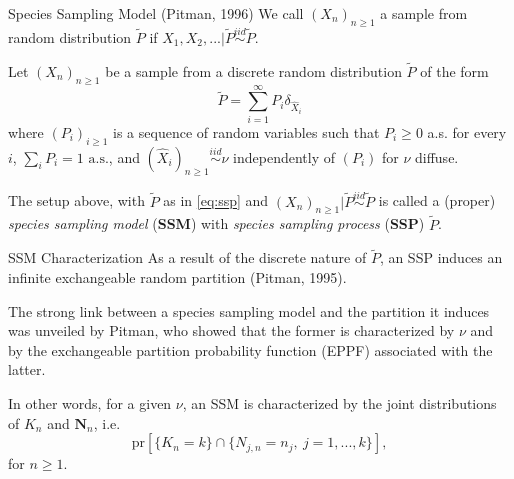 \documentclass[11pt, handout]{beamer}
\begin{document}
\begin{frame}{Species Sampling Model (Pitman, 1996)}
    We call \((X_n)_{n \geq 1}\) a sample from random distribution \(\tilde{P}\) if \(X_1,X_2,... | \tilde{P} \overset{iid}{\sim} \tilde{P}\).
    \begin{definition}
        \label{th:ssm}
        Let \((X_n)_{n \geq 1}\) be a sample from a discrete random distribution \(\tilde{P}\) of the form
        \begin{equation}
            \label{eq:ssp}
            \tilde{P} = \sum_{i = 1}^{\infty} P_{i} \delta_{\hat{X}_i}
        \end{equation}
        where \((P_i)_{i \geq 1}\) is a sequence of random variables such that \(P_i \geq 0\) a.s. for every \(i\), \(\sum_i P_i = 1 \text{ a.s.}\), and \((\hat{X}_i)_{n \geq 1} \overset{iid}{\sim} \nu\) independently of \((P_i)\) for \(\nu\) diffuse.
    \end{definition}
    \medskip
    \pause
    The setup above, with \(\tilde{P}\) as in \eqref{eq:ssp} and \((X_n)_{n \geq 1} | \tilde{P} \overset{iid}{\sim} \tilde{P}\) is called a (proper) \textit{species sampling model} (\textbf{SSM}) with \textit{species sampling process} (\textbf{SSP}) \(\tilde{P}\).
\end{frame}

\begin{frame}{SSM Characterization}
    As a result of the discrete nature of \(\tilde{P}\), an SSP induces an infinite exchangeable random partition (Pitman, 1995).
    \medskip
    
    The strong link between a species sampling model and the partition it induces was unveiled by Pitman, who showed that the former is characterized by \(\nu\) and by the exchangeable partition probability function (EPPF) associated with the latter. 
    \medskip
    
    In other words, for a given \(\nu\), an SSM is characterized by the joint distributions of \(K_n\) and \(\mathbf{N}_n\), i.e.
    \begin{equation*}
        \text{pr}[\{K_n = k\} \cap \{N_{j,n} = n_j,\ j = 1,...,k\}],
    \end{equation*}
    for \(n \geq 1\).
\end{frame}
\end{document}
